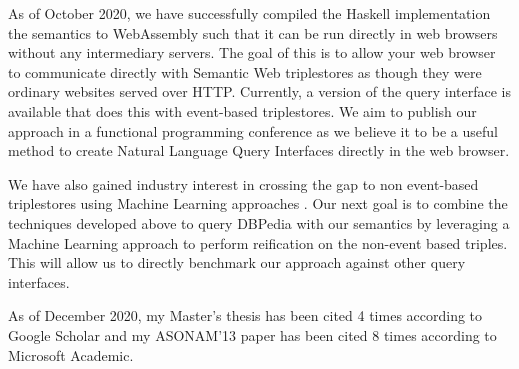 \documentclass[../main.tex]{subfiles}
\begin{document}
\begin{refsection}
    As of October 2020, we have successfully compiled the Haskell implementation the semantics to WebAssembly such that it can be run directly in web browsers without any intermediary servers.  The goal of this is to allow your web browser to communicate directly with Semantic Web triplestores as though they were ordinary websites served over HTTP.  Currently, a version of the query interface is available that does this with event-based triplestores.  We aim to publish our approach in a functional programming conference as we believe it to be a useful method to create Natural Language Query Interfaces directly in the web browser.

    We have also gained industry interest in crossing the gap to non event-based triplestores using Machine Learning approaches \cite{timbr}.  Our next goal is to combine the techniques developed above to query DBPedia with our semantics by leveraging a Machine Learning approach to perform reification on the non-event based triples.  This will allow us to directly benchmark our approach against other query interfaces.

    As of December 2020, my Master's thesis \cite{peelar2016accommodating} has been cited 4 times according to Google Scholar and my ASONAM'13 paper has been cited 8 times according to Microsoft Academic.



\printbibliography[heading=subbibintoc]
\end{refsection}
\end{document}
